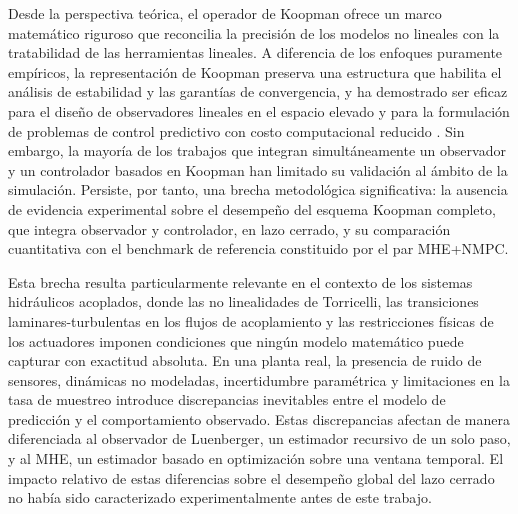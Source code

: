 \documentclass[12pt,letterpaper]{article}
\begin{document}
Desde la perspectiva teórica, el operador de Koopman ofrece un marco matemático
riguroso que reconcilia la precisión de los modelos no lineales con la tratabilidad
de las herramientas lineales. A diferencia de los enfoques puramente empíricos, la
representación de Koopman preserva una estructura que habilita el análisis de
estabilidad y las garantías de convergencia, y ha demostrado ser eficaz para el
diseño de observadores lineales en el espacio elevado \cite{surana2016, netto2020}
y para la formulación de problemas de control predictivo con costo computacional
reducido \cite{korda2018, tellez2022}. Sin embargo, la mayoría de los trabajos que
integran simultáneamente un observador y un controlador basados en Koopman han
limitado su validación al ámbito de la simulación. Persiste, por tanto, una brecha
metodológica significativa: la ausencia de evidencia experimental sobre el
desempeño del esquema Koopman completo, que integra observador y controlador, en
lazo cerrado, y su comparación cuantitativa con el benchmark de referencia
constituido por el par MHE+NMPC.

Esta brecha resulta particularmente relevante en el contexto de los sistemas
hidráulicos acoplados, donde las no linealidades de Torricelli, las transiciones
laminares-turbulentas en los flujos de acoplamiento y las restricciones físicas de
los actuadores imponen condiciones que ningún modelo matemático puede capturar con
exactitud absoluta. En una planta real, la presencia de ruido de sensores,
dinámicas no modeladas, incertidumbre paramétrica y limitaciones en la tasa de
muestreo introduce discrepancias inevitables entre el modelo de predicción y el
comportamiento observado. Estas discrepancias afectan de manera diferenciada al
observador de Luenberger, un estimador recursivo de un solo paso, y al MHE, un
estimador basado en optimización sobre una ventana temporal. El impacto relativo de
estas diferencias sobre el desempeño global del lazo cerrado no había sido
caracterizado experimentalmente antes de este trabajo.
\end{document}
